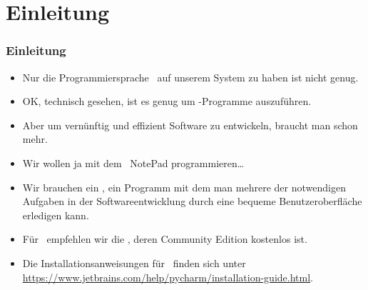 \documentclass[aspectratio=169,mathserif,notheorems]{beamer}%
\subtitle{4.~PyCharm Installieren}%
\begin{document}
%
%
\startPresentation%
%
\section{Einleitung}%
%
\begin{frame}[t]%
\frametitle{Einleitung}%
\begin{itemize}%
\item Nur die Programmiersprache \python\ auf unserem System zu haben ist nicht genug.%
\item<2-> OK, technisch gesehen, ist es genug um \python-Programme auszuführen.%
\item<3-> Aber um vernünftig und effizient Software zu entwickeln, braucht man schon mehr.%
\item<4-> Wir wollen ja mit dem \microsoftWindows\ NotePad programmieren\dots%
\item<6-> Wir brauchen ein , ein Programm mit dem man mehrere der notwendigen Aufgaben in der Softwareentwicklung durch eine bequeme Benutzeroberfläche erledigen kann.%
\item<7-> Für \python\ empfehlen wir die \pycharm\cite{VHN2023HOADWP,Y2022PPADT,W2024PME} , deren Community Edition kostenlos ist.%
\item<8-> Die Installationsanweisungen für \pycharm\ finden sich unter \url{https://www.jetbrains.com/help/pycharm/installation-guide.html}.%
\end{itemize}%
%
%
\end{frame}%
%
\end{document}
